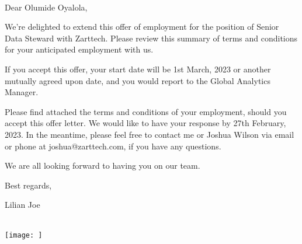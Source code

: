 \documentclass[
  12pt,
]{letter}
\begin{document}
\begin{letter}{\\}
\vspace*{2ex}
\opening{}
\setstretch{}\ifdefined\Shaded\renewenvironment{Shaded}{\begin{tcolorbox}[borderline west={3pt}{0pt}{shadecolor}, interior hidden, boxrule=0pt, enhanced, sharp corners, frame hidden, breakable]}{\end{tcolorbox}}\fi

Dear Olumide Oyalola,

We're delighted to extend this offer of employment for the position of
Senior Data Steward with Zarttech. Please review this summary of terms
and conditions for your anticipated employment with us.

If you accept this offer, your start date will be 1st March, 2023 or
another mutually agreed upon date, and you would report to the Global
Analytics Manager.

Please find attached the terms and conditions of your employment, should
you accept this offer letter. We would like to have your response by
27th February, 2023. In the meantime, please feel free to contact me or
Joshua Wilson via email or phone at joshua@zarttech.com, if you have any
questions.

We are all looking forward to having you on our team.

Best regards,

Lilian Joe



\vspace{4\parskip}%
\closing{\\[1em]\texttt{[image: ]}}
\end{letter}
\end{document}
